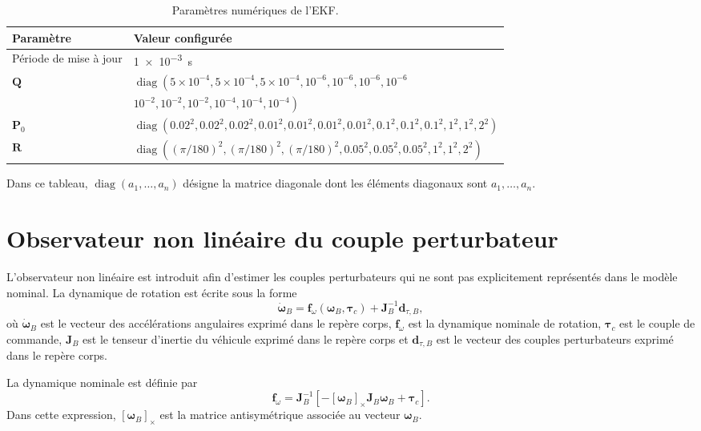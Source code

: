 \documentclass[11pt,a4paper,oneside]{report}
\newcommand{\vect}[1]{\bm{#1}}
\newcommand{\diag}{\operatorname{diag}}
\newcommand{\crossmat}[1]{\left[#1\right]_{\times}}
\begin{document}
\begin{table}[H]
	\centering
	\caption{Paramètres numériques de l'EKF.}
	\label{tab_ekf_parameters}
	\begin{tabularx}{\textwidth}{@{}L{3.2cm}Y@{}}
		\toprule
		\textbf{Paramètre} & \textbf{Valeur configurée}\\
		\midrule
		Période de mise à jour & \SI{1e-3}{s}\\
		$\mathbf Q$ &
		$\diag\!\left(
		5{\times}10^{-4},5{\times}10^{-4},5{\times}10^{-4},
		10^{-6},10^{-6},10^{-6},10^{-6}
		\right.$\\[-0.2em]
		& $\left.
		10^{-2},10^{-2},10^{-2},
		10^{-4},10^{-4},10^{-4}
		\right)$\\
		$\mathbf P_0$ &
		$\diag\!\left(
		0.02^2,0.02^2,0.02^2,
		0.01^2,0.01^2,0.01^2,0.01^2,
		0.1^2,0.1^2,0.1^2,
		1^2,1^2,2^2
		\right)$\\
		$\mathbf R$ &
		$\diag\!\left(
		(\pi/180)^2,(\pi/180)^2,(\pi/180)^2,
		0.05^2,0.05^2,0.05^2,
		1^2,1^2,2^2
		\right)$\\
		\bottomrule
	\end{tabularx}
\end{table}
Dans ce tableau, $\diag(a_1,\ldots,a_n)$ désigne la matrice diagonale dont les éléments diagonaux sont $a_1,\ldots,a_n$.

\section{Observateur non linéaire du couple perturbateur}
L'observateur non linéaire est introduit afin d'estimer les couples perturbateurs qui ne sont pas explicitement représentés dans le modèle nominal. La dynamique de rotation est écrite sous la forme
\begin{equation}
	\dot{\vect\omega}_B=\vect f_\omega(\vect\omega_B,\vect\tau_c)+\mathbf J_B^{-1}\vect d_{\tau,B},
	\label{eq_ndo_system}
\end{equation}
où $\dot{\vect\omega}_B$ est le vecteur des accélérations angulaires exprimé dans le repère corps, $\vect f_\omega$ est la dynamique nominale de rotation, $\vect\tau_c$ est le couple de commande, $\mathbf J_B$ est le tenseur d'inertie du véhicule exprimé dans le repère corps et $\vect d_{\tau,B}$ est le vecteur des couples perturbateurs exprimé dans le repère corps.

La dynamique nominale est définie par
\begin{equation}
	\vect f_\omega=\mathbf J_B^{-1}\left[-\crossmat{\vect\omega_B}\mathbf J_B\vect\omega_B+\vect\tau_c\right].
	\label{eq_ndo_nominal}
\end{equation}
Dans cette expression, $\crossmat{\vect\omega_B}$ est la matrice antisymétrique associée au vecteur $\vect\omega_B$.
\end{document}
